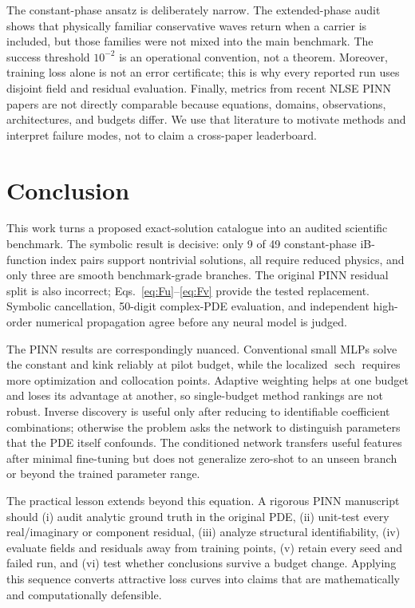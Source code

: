 \documentclass[11pt]{article}
\newcommand{\sech}{\operatorname{sech}}
\begin{document}
The constant-phase ansatz is deliberately narrow.  The extended-phase audit
shows that physically familiar conservative waves return when a carrier is
included, but those families were not mixed into the main benchmark.  The
success threshold $10^{-2}$ is an operational convention, not a theorem.
Moreover, training loss alone is not an error certificate; this is why every
reported run uses disjoint field and residual evaluation.  Finally, metrics
from recent NLSE PINN papers are not directly comparable because equations,
domains, observations, architectures, and budgets differ.  We use that
literature to motivate methods and interpret failure modes, not to claim a
cross-paper leaderboard.

\section{Conclusion}
\label{sec:conclusion}

This work turns a proposed exact-solution catalogue into an audited scientific
benchmark.  The symbolic result is decisive: only 9 of 49 constant-phase
iB-function index pairs support nontrivial solutions, all require reduced
physics, and only three are smooth benchmark-grade branches.  The original
PINN residual split is also incorrect; Eqs.~\eqref{eq:Fu}--\eqref{eq:Fv}
provide the tested replacement.  Symbolic cancellation, 50-digit complex-PDE
evaluation, and independent high-order numerical propagation agree before any
neural model is judged.

The PINN results are correspondingly nuanced.  Conventional small MLPs solve
the constant and kink reliably at pilot budget, while the localized $\sech$
requires more optimization and collocation points.  Adaptive weighting helps
at one budget and loses its advantage at another, so single-budget method
rankings are not robust.  Inverse discovery is useful only after reducing to
identifiable coefficient combinations; otherwise the problem asks the network
to distinguish parameters that the PDE itself confounds.  The conditioned
network transfers useful features after minimal fine-tuning but does not
generalize zero-shot to an unseen branch or beyond the trained parameter range.

The practical lesson extends beyond this equation.  A rigorous PINN manuscript
should (i) audit analytic ground truth in the original PDE, (ii) unit-test every
real/imaginary or component residual, (iii) analyze structural
identifiability, (iv) evaluate fields and residuals away from training points,
(v) retain every seed and failed run, and (vi) test whether conclusions survive
a budget change.  Applying this sequence converts attractive loss curves into
claims that are mathematically and computationally defensible.
\end{document}
